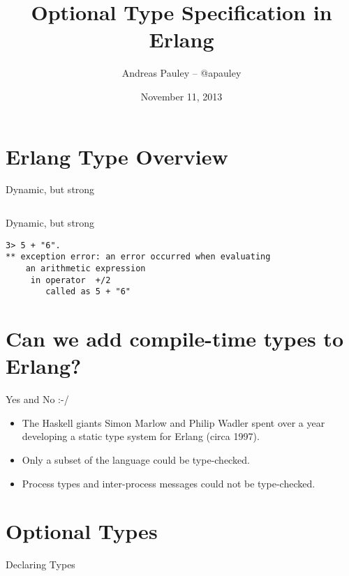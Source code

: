 \documentclass{beamer}
\title[Types in Erlang]{Optional Type Specification in Erlang}
\author{Andreas Pauley -- @apauley}
\institute{Lambda Luminaries -- @lambdaluminary}
\date{November 11, 2013}
\begin{document}
\begin{frame}
  \titlepage
\end{frame}

\section{Erlang Type Overview}

\begin{frame}{Dynamic, but strong}

  \inputminted[firstline=5]{erlang}{src/dynamic.erl}

\end{frame}

\begin{frame}[fragile]{Dynamic, but strong}

  \begin{verbatim}
3> 5 + "6".
** exception error: an error occurred when evaluating
    an arithmetic expression
     in operator  +/2
        called as 5 + "6"
  \end{verbatim}

\end{frame}

\section{Can we add compile-time types to Erlang?}

\begin{frame}{Yes and No :-/}

  \begin{itemize}[<+->]
  \item The Haskell giants Simon Marlow and Philip Wadler spent over a year
    developing a static type system for Erlang (circa 1997).
  \item Only a subset of the language could be type-checked.
  \item Process types and inter-process messages could not be type-checked.
  \end{itemize}

\end{frame}

\section{Optional Types}

\begin{frame}{Declaring Types}

  \inputminted[firstline=4, lastline=6]{erlang}{src/cards.erl}

\end{frame}
\end{document}
